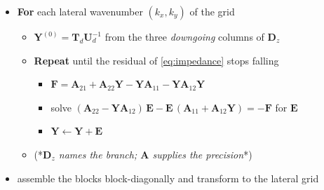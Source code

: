 \documentclass[11pt,a4paper]{article}
\newcommand{\bA}{\mathbf{A}}
\newcommand{\bY}{\mathbf{Y}}
\begin{document}
\begin{minipage}{\linewidth}
\begin{itemize}
\begin{itemize}
\item (*{\em bottom of the slab, $z_M=H$: the half-space impedance, one
$3\times3$ block
per lateral wavenumber\/}*)
\end{itemize}

\item \textbf{For} each lateral wavenumber $(k_x,k_y)$ of the grid
\begin{itemize}
\item $\bY^{(0)} = \mathbf{T}_d\mathbf{U}_d^{-1}$ from the three
      \emph{downgoing} columns of $\mathbf{D}_z$
\item \textbf{Repeat} until the residual of \eqref{eq:impedance} stops falling
\begin{itemize}
\item $\mathbf{F} = \bA_{21}+\bA_{22}\bY-\bY\bA_{11}-\bY\bA_{12}\bY$
\item solve
      $(\bA_{22}-\bY\bA_{12})\,\mathbf{E}-\mathbf{E}\,(\bA_{11}+\bA_{12}\bY)
       = -\mathbf{F}$ \quad for $\mathbf{E}$
\item $\bY \leftarrow \bY+\mathbf{E}$
\end{itemize}
\item (*{\em $\mathbf{D}_z$ names the branch; $\bA$ supplies the precision\/}*)
\end{itemize}
\item assemble the blocks block-diagonally and transform to the lateral grid
\end{itemize}
\end{minipage}
\end{document}
